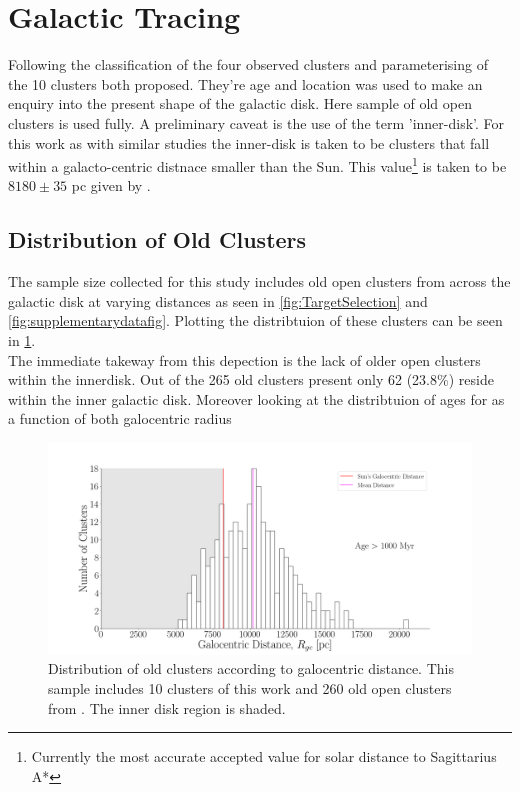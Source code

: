 \section{Galactic Tracing}

Following the classification of the four observed clusters and parameterising of the 10 clusters both proposed. They're age and location was used to make an enquiry into the present shape of the galactic disk. Here \cite{2020A&A...640A...1C} sample of old open clusters is used fully. A preliminary caveat is the use of the term 'inner-disk'. For this work as with similar studies the inner-disk is taken to be clusters that fall within a galacto-centric distnace smaller than the Sun. This value\footnote{Currently the most accurate accepted value for solar distance to Sagittarius A*} is taken to be $8180 \pm 35$ pc given by \cite{2018A&A...616A...1G}.

\subsection{Distribution of Old Clusters}

The sample size collected for this study includes old open clusters from across the galactic disk at varying distances as seen in \cref{fig:TargetSelection} and \cref{fig:supplementarydatafig}. Plotting the distribtuion of these clusters can be seen in \cref{fig:oc_dist}. \\ The immediate takeway from this depection is the lack of older open clusters within the innerdisk. Out of the 265 old clusters present only 62 (23.8\%) reside within the inner galactic disk. Moreover looking at the distribtuion of ages for as a function of both galocentric radius 

\begin{figure}[ht!]
  \centering
  \includegraphics[width = \textwidth]{figures/opencluster_distribution.png}
  \caption{Distribution of old clusters according to galocentric distance. This sample includes 10 clusters of this work and 260 old open clusters from \cite{2020A&A...640A...1C}. The inner disk region is shaded. } \label{fig:oc_dist}
\end{figure}

